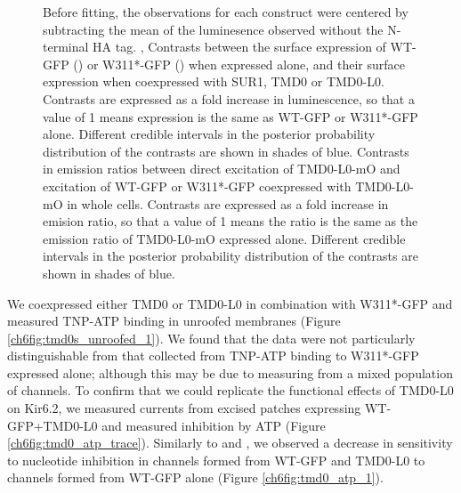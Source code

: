 \begin{figure}[hbtp]
{	Before fitting, the observations for each construct were centered by subtracting the mean of the luminesence observed without the N-terminal HA tag.
	,  Contrasts between the surface expression of WT-GFP () or W311*-GFP () when expressed alone, and their surface expression when coexpressed with SUR1, TMD0 or TMD0-L0.
	Contrasts are expressed as a fold increase in luminescence, so that a value of 1 means expression is the same as WT-GFP or W311*-GFP alone.
	Different credible intervals in the posterior probability distribution of the contrasts are shown in shades of blue.
	 Contrasts in emission ratios between direct excitation of TMD0-L0-mO and excitation of WT-GFP or W311*-GFP coexpressed with TMD0-L0-mO in whole cells.
	Contrasts are expressed as a fold increase in emision ratio, so that a value of 1 means the ratio is the same as the emission ratio of TMD0-L0-mO expressed alone.
	Different credible intervals in the posterior probability distribution of the contrasts are shown in shades of blue.
	}\label{ch6fig:tmd0_assays}
\end{figure}

We coexpressed either TMD0 or TMD0-L0 in combination with W311*-GFP and measured TNP-ATP binding in unroofed membranes (Figure \ref{ch6fig:tmd0s_unroofed_1}).
We found that the data were not particularly distinguishable from that collected from TNP-ATP binding to W311*-GFP expressed alone; although this may be due to measuring from a mixed population of channels.
To confirm that we could replicate the functional effects of TMD0-L0 on Kir6.2, we measured currents from excised patches expressing WT-GFP+TMD0-L0 and measured inhibition by ATP (Figure \ref{ch6fig:tmd0_atp_trace}).
Similarly to \textcite{babenko_sur_2003-1} and \textcite{chan_n-terminal_2003-1}, we observed a decrease in sensitivity to nucleotide inhibition in channels formed from WT-GFP and TMD0-L0 to channels formed from WT-GFP alone (Figure \ref{ch6fig:tmd0_atp_1}).

